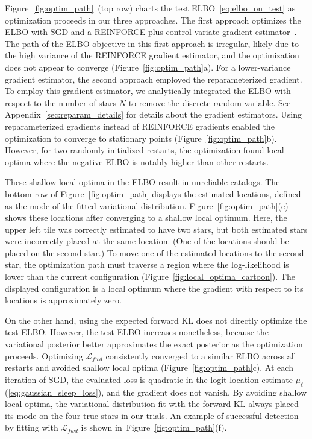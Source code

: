 Figure~\ref{fig:optim_path}~(top row) charts the test ELBO~\eqref{eq:elbo_on_test}
as optimization proceeds in our three approaches.
The first approach optimizes the ELBO with SGD and a REINFORCE plus control-variate gradient estimator~\citep{ranganath2013black}.
The path of the ELBO objective in this first approach is irregular, likely due to the high variance of the REINFORCE gradient estimator, 
and the optimization does not appear to converge (Figure~\ref{fig:optim_path}a).
For a lower-variance gradient estimator, the second approach employed the reparameterized gradient. To employ this gradient estimator, we analytically integrated the ELBO with respect to the number of stars $N$ to remove the discrete random variable.
See Appendix~\ref{sec:reparam_details} for details about the gradient estimators.
Using reparameterized gradients instead of REINFORCE gradients enabled the optimization to converge to stationary points (Figure~\ref{fig:optim_path}b).
However, for two randomly initialized restarts,
the optimization found local optima where the negative ELBO is notably higher than other restarts.

These shallow local optima in the ELBO result in unreliable catalogs.
The bottom row of Figure~\ref{fig:optim_path} displays the estimated locations, defined as the mode of the fitted variational distribution.
Figure~\ref{fig:optim_path}(e) shows these locations after converging to a shallow local optimum.
Here, the upper left tile was correctly estimated to have two stars, but both estimated stars were incorrectly placed at the same location.
(One of the locations should be placed on the second star.)
To move one of the estimated locations to the second star, the optimization path must traverse a region where the log-likelihood is lower than the current configuration (Figure~\ref{fig:local_optima_cartoon}).
The displayed configuration is a local optimum where the gradient with respect to its locations is approximately zero.

On the other hand, using
the expected forward KL does not directly optimize the test ELBO.
However, the test ELBO increases nonetheless, because the variational posterior
better approximates the exact posterior as the optimization proceeds.
Optimizing $\mathcal{L}_{fwd}$ consistently converged to
a similar ELBO across all restarts and avoided shallow local optima (Figure~\ref{fig:optim_path}c).
At each iteration of SGD, 
the evaluated loss is quadratic in 
the logit-location estimate
$\mu_\ell$ (\ref{eq:gaussian_sleep_loss}),
and the gradient does not vanish.
By avoiding shallow local optima, the variational distribution fit with the forward KL
always placed its mode on the four true stars in our trials.
An example of successful detection by fitting with
$\mathcal{L}_{fwd}$ is shown in~Figure~\ref{fig:optim_path}(f).

